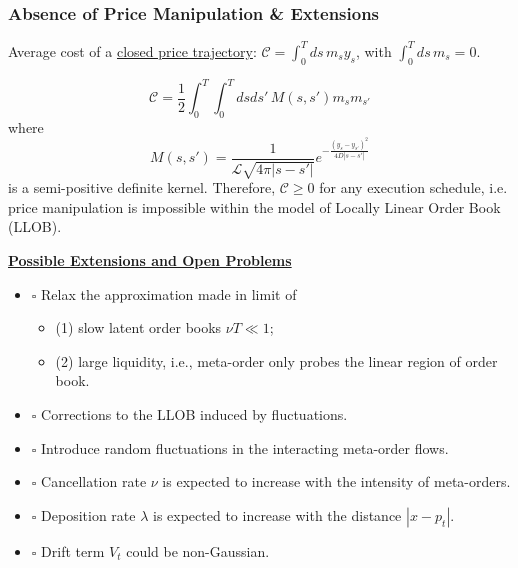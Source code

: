\documentclass{beamer}
\begin{document}
\begin{frame}
{{\begin{columns}
\begin{column}{0.45\textwidth}
\begin{center}
     \end{center}
\end{column}
\end{columns}

}
}
\end{frame}

\begin{frame}
\frametitle{Absence of Price Manipulation \& Extensions}
{
\footnotesize{
Average cost of a \underline{closed price trajectory}:
$\mathcal{C} = \int_0^T ds\, m_s y_s$, with $\int_0^T ds\,m_s = 0$. 

$$
\mathcal{C} = \frac{1}{2} \int_0^T \int_0^T ds ds'\,  M(s,s') m_s m_{s'}
$$
where 
$$
M(s,s') = \frac{1}{\mathcal{L}\sqrt{4\pi|s-s'|}}e^{-\frac{(y_s-y_{s'})^2}{4D|s-s'|}}
$$
is a semi-positive definite kernel. Therefore, $\mathcal{C}\ge 0$ for any execution schedule, i.e. price
manipulation is impossible within the model of Locally Linear Order Book (LLOB).
\newline
}
\newline
\underline{\textbf{Possible Extensions and Open Problems}}

\begin{itemize}[noitemsep]
\item $\square$ Relax the approximation made in limit of
    \begin{itemize}[noitemsep]
        \item (1) slow latent order books $\nu T \ll 1$;
        \item (2) large liquidity, i.e., meta-order only probes the linear region of order book.
    \end{itemize}
\item $\square$ Corrections to the LLOB induced by fluctuations.
\item $\square$ Introduce random fluctuations in the interacting meta-order flows.
\item $\square$ Cancellation rate $\nu$ is expected to increase with the intensity of meta-orders.
\item $\square$ Deposition rate $\lambda$ is expected to increase with the distance $|x-p_t|$.
\item $\square$ Drift term $V_t$ could be non-Gaussian.
\end{itemize}
}

\end{frame}
\end{document}
